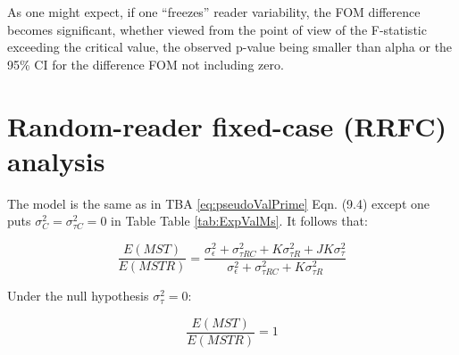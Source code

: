 \documentclass[
]{book}
\newenvironment{Shaded}{\begin{snugshade}}{\end{snugshade}}
\newcommand{\CommentTok}[1]{\textcolor[rgb]{0.56,0.35,0.01}{\textit{#1}}}
\newcommand{\DecValTok}[1]{\textcolor[rgb]{0.00,0.00,0.81}{#1}}
\newcommand{\KeywordTok}[1]{\textcolor[rgb]{0.13,0.29,0.53}{\textbf{#1}}}
\newcommand{\NormalTok}[1]{#1}
\newcommand{\OperatorTok}[1]{\textcolor[rgb]{0.81,0.36,0.00}{\textbf{#1}}}
\newcommand{\StringTok}[1]{\textcolor[rgb]{0.31,0.60,0.02}{#1}}
\begin{document}
\begin{Shaded}
\end{Shaded}

As one might expect, if one ``freezes'' reader variability, the FOM difference becomes significant, whether viewed from the point of view of the F-statistic exceeding the critical value, the observed p-value being smaller than alpha or the 95\% CI for the difference FOM not including zero.

\hypertarget{dbm-analysis-special-cases-RRFCAnalysis}{%
\section{Random-reader fixed-case (RRFC) analysis}\label{dbm-analysis-special-cases-RRFCAnalysis}}

The model is the same as in TBA \eqref{eq:pseudoValPrime} Eqn. (9.4) except one puts \(\sigma_C^2 = \sigma_{\tau C}^2 =0\) in Table Table \ref{tab:ExpValMs}. It follows that:

\begin{equation}
\frac{E(MST)}{E(MSTR)}=\frac{\sigma_\epsilon^2+\sigma_{\tau RC}^2+K\sigma_{\tau R}^2+JK\sigma_{\tau}^2}{\sigma_\epsilon^2+\sigma_{\tau RC}^2+K\sigma_{\tau R}^2}
\end{equation}

Under the null hypothesis \(\sigma_\tau^2 = 0\):

\begin{equation}
\frac{E(MST)}{E(MSTR)}=1
\end{equation}
\end{document}
